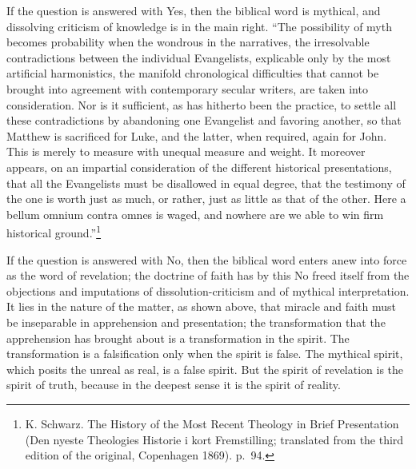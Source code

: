 \documentclass[12pt,a4paper,openany]{book}
\newcommand{\opage}[1]{\marginnote{\footnotesize\textit{[#1]}}}
\begin{document}
If the question is answered with Yes, then the biblical word is
mythical, and dissolving criticism of knowledge is in the main
right. ``The possibility of myth becomes probability
when the wondrous in the narratives, the irresolvable
contradictions between the individual Evangelists, explicable only
by the most artificial harmonistics, the manifold
chronological difficulties that cannot be
brought into agreement with contemporary secular writers,
are taken into consideration. Nor is it
sufficient, as has hitherto been the practice, to settle all these
contradictions by abandoning one Evangelist and favoring
another, so that Matthew is sacrificed for
Luke, and the latter, when required, again for John.
This is merely to measure with unequal measure and weight. It
moreover appears, on an impartial consideration of the different
historical presentations, that all the Evangelists must
\setcounter{footnote}{0}%
\opage{36}be disallowed in equal degree, that the testimony of the one is
worth just as much, or rather, just as little as
that of the other. Here a bellum omnium contra omnes is waged,
and nowhere are we able to win firm historical ground.''\footnote[1]{K. Schwarz. The History of the Most Recent Theology in Brief Presentation (Den nyeste Theologies Historie i kort Fremstilling; translated from the third edition of the original, Copenhagen 1869). p.\ 94.}

If the question is answered with No, then the biblical word enters
anew into force as the word of revelation; the doctrine of faith
has by this No freed itself from the objections and imputations of dissolution-criticism
and of mythical interpretation.
It lies in the nature of the matter, as shown above, that miracle
and faith must be inseparable in apprehension and presentation;
the transformation that the apprehension has brought about is
a transformation in the spirit. The transformation is a
falsification only when the spirit is false. The mythical spirit,
which posits the unreal as real, is a false spirit.
But the spirit of revelation is the spirit of truth, because
in the deepest sense it is the spirit of reality.
\end{document}
